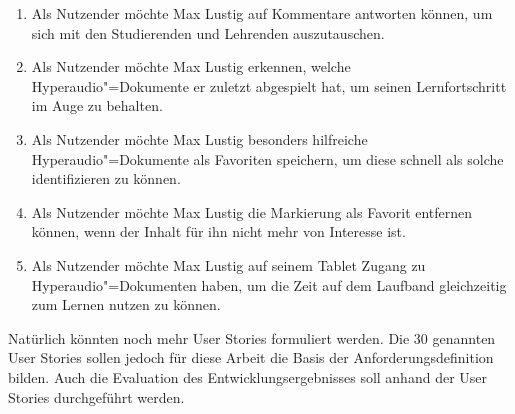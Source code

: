 \begin{enumerate}[leftmargin=1.3cm,label=US-\arabic*:,ref=US-\arabic*]
\item \label{US-Antwort-S} Als Nutzender möchte Max Lustig auf Kommentare antworten können, um sich mit den Studierenden und Lehrenden auszutauschen.

\item \label{US-Uebersicht-Letzte} Als Nutzender möchte Max Lustig erkennen, welche Hyperaudio"=Dokumente er zuletzt abgespielt hat, um seinen Lernfortschritt im Auge zu behalten.

\item \label{US-Favoriten} Als Nutzender möchte Max Lustig besonders hilfreiche Hyperaudio"=Dokumente als Favoriten speichern, um diese schnell als solche identifizieren zu können.

\item \label{US-Favoriten-Loeschen} Als Nutzender möchte Max Lustig die Markierung als Favorit entfernen können, wenn der Inhalt für ihn nicht mehr von Interesse ist.

\item \label{US-Zeit-Mobil} Als Nutzender möchte Max Lustig auf seinem Tablet Zugang zu Hyperaudio"=Dokumenten haben, um die Zeit auf dem Laufband gleichzeitig zum Lernen nutzen zu können.

\end{enumerate}

Natürlich könnten noch mehr User Stories formuliert werden. Die 30 genannten User Stories sollen jedoch für diese Arbeit die Basis der Anforderungsdefinition bilden. Auch die Evaluation des Entwicklungsergebnisses soll anhand der User Stories durchgeführt werden.

%
%
%
%


